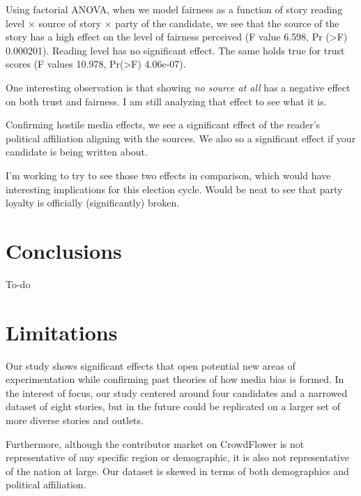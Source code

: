 Using factorial ANOVA, when we model fairness as a function of story reading level $\times$ source of story $\times$ party of the candidate, we see that the source of the story has a high effect on the level of fairness perceived (F value 6.598, Pr (>F) 0.000201). Reading level has no significant effect. The same holds true for trust scores (F values 10.978, Pr(>F) 4.06e-07).

One interesting observation is that showing \emph{no source at all} has a negative effect on both trust and fairness. I am still analyzing that effect to see what it is.
 
Confirming hostile media effects, we see a significant effect of the reader's political affiliation aligning with the sources. We also so a significant effect if your candidate is being written about. 

I'm working to try to see those two effects in comparison, which would have interesting implications for this election cycle. Would be neat to see that party loyalty is officially (significantly) broken.



\section{Conclusions}

To-do

\section{Limitations}

Our study shows significant effects that open potential new areas of experimentation while confirming past theories of how media bias is formed. In the interest of focus, our study centered around four candidates and a narrowed dataset of eight stories, but in the future could be replicated on a larger set of more diverse stories and outlets. 

Furthermore, although the contributor market on CrowdFlower is not representative of any specific region or demographic, it is also not representative of the nation at large. Our dataset is skewed in terms of both demographics and political affiliation.



